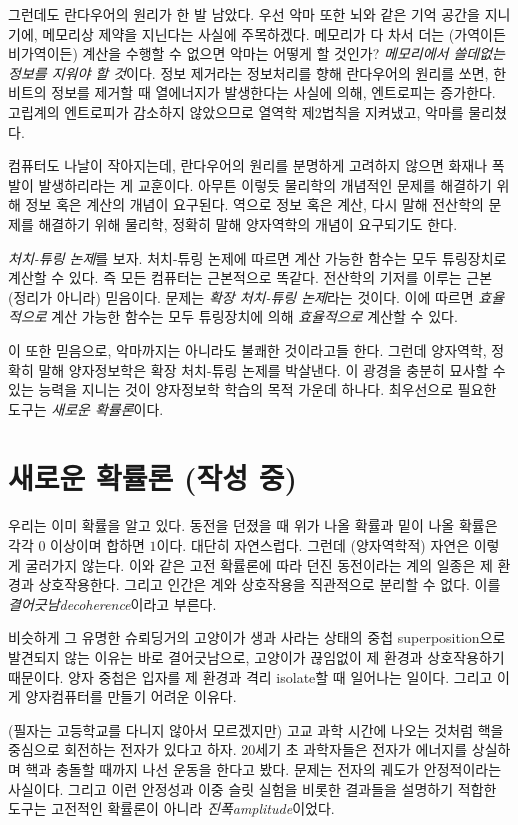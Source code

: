 \documentclass[a4paper,chapter,atbegshi]{oblivoir}
\begin{document}
그런데도 란다우어의 원리가 한 발 남았다. 우선 악마 또한 뇌와 같은 기억 공간을
지니기에, 메모리상 제약을 지닌다는 사실에 주목하겠다. 메모리가 다 차서
더는 (가역이든 비가역이든) 계산을 수행할 수 없으면 악마는 어떻게 할 것인가?
\emph{메모리에서 쓸데없는 정보를 지워야 할 것}이다. 정보 제거라는 정보처리를
향해 란다우어의 원리를 쏘면, 한 비트의 정보를 제거할 때 열에너지가 발생한다는
사실에 의해, 엔트로피는 증가한다. 고립계의 엔트로피가 감소하지 않았으므로
열역학 제2법칙을 지켜냈고, 악마를 물리쳤다. 

컴퓨터도 나날이 작아지는데, 란다우어의 원리를 분명하게 고려하지 않으면 화재나
폭발이 발생하리라는 게 교훈이다. 아무튼 이렇듯 물리학의 개념적인 문제를
해결하기 위해 정보 혹은 계산의 개념이 요구된다. 역으로 정보 혹은 계산, 다시 말해
전산학의 문제를 해결하기 위해 물리학, 정확히 말해 양자역학의 개념이 요구되기도
한다. 

\emph{처치-튜링 논제}를 보자. 처치-튜링 논제에 따르면 계산 가능한 함수는 모두
튜링장치로 계산할 수 있다. 즉 모든 컴퓨터는 근본적으로 똑같다. 전산학의
기저를 이루는 근본 (정리가 아니라) 믿음이다. 문제는 \emph{확장 처치-튜링 논제}라는
것이다. 이에 따르면 \emph{효율적으로} 계산 가능한 함수는 모두 튜링장치에 의해
\emph{효율적으로} 계산할 수 있다. 

이 또한 믿음으로, 악마까지는 아니라도 불쾌한 것이라고들 한다. 그런데 양자역학,
정확히 말해 양자정보학은 확장 처치-튜링 논제를 박살낸다. 이 광경을 충분히 묘사할
수 있는 능력을 지니는 것이 양자정보학 학습의 목적 가운데 하나다. 최우선으로 필요한
도구는 \emph{새로운 확률론}이다. 

\chapter{새로운 확률론 (작성 중)} 
우리는 이미 확률을 알고 있다. 동전을 던졌을 때 위가 나올 확률과 밑이 나올 확률은
각각 $0$ 이상이며 합하면 $1$이다. 대단히 자연스럽다. 그런데 (양자역학적) 자연은
이렇게 굴러가지 않는다. 이와 같은 고전 확률론에 따라 던진 동전이라는 계의 일종은
제 환경과 상호작용한다. 그리고 인간은 계와 상호작용을 직관적으로 분리할 수 없다.
이를 \emph{결어긋남\tiny decoherence}이라고 부른다.

비슷하게 그 유명한 슈뢰딩거의 고양이가 생과 사라는 상태의 중첩{\tiny
superposition}으로 발견되지 않는 이유는 바로 결어긋남으로, 고양이가 끊임없이
제 환경과 상호작용하기 때문이다. 양자 중첩은 입자를 제 환경과 격리{\tiny
isolate}할 때 일어나는 일이다. 그리고 이게 양자컴퓨터를 만들기 어려운 이유다.

(필자는 고등학교를 다니지 않아서 모르겠지만) 고교 과학 시간에 나오는 것처럼
핵을 중심으로 회전하는 전자가 있다고 하자. 20세기 초 과학자들은 전자가 에너지를
상실하며 핵과 충돌할 때까지 나선 운동을 한다고 봤다. 문제는 전자의 궤도가
안정적이라는 사실이다. 그리고 이런 안정성과 이중 슬릿 실험을 비롯한 결과들을
설명하기 적합한 도구는 고전적인 확률론이 아니라 \emph{진폭\tiny amplitude}이었다.
\end{document}
